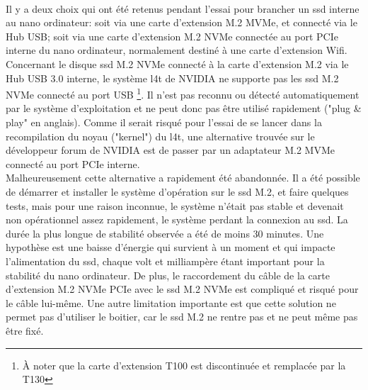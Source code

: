\vspace{\baselineskip}
\\
\noindent Il y a deux choix qui ont été retenus pendant l'essai pour brancher un \acrshort{ssd} interne au nano ordinateur: soit via une carte d'extension M.2 MVMe, et connecté via le Hub USB; soit via une carte d'extension M.2 NVMe connectée au port PCIe interne du nano ordinateur, normalement destiné à une carte d'extension Wifi.
\vspace{\baselineskip}
\\
\noindent Concernant le disque \acrshort{ssd} M.2 NVMe connecté à la carte d'extension M.2 via le Hub USB 3.0 interne, le système \acrshort{l4t} de NVIDIA ne supporte pas les \acrshort{ssd} M.2 NVMe connecté au port USB \footnote{À noter que la carte d'extension T100 est discontinuée et remplacée par la T130}. Il n'est pas reconnu ou détecté automatiquement par le système d'exploitation et ne peut donc pas être utilisé rapidement ("plug \& play" en anglais). Comme il serait risqué pour l'essai de se lancer dans la recompilation du noyau ("kernel") du \acrshort{l4t}, une alternative trouvée sur le développeur forum de NVIDIA est de passer par un adaptateur M.2 MVMe connecté au port PCIe interne.
\vspace{\baselineskip}
\\
\noindent Malheureusement cette alternative a rapidement été abandonnée. Il a été possible de démarrer et installer le système d'opération sur le \acrshort{ssd} M.2, et faire quelques tests, mais pour une raison inconnue, le système n'était pas stable et devenait non opérationnel assez rapidement, le système perdant la connexion au \acrshort{ssd}. La durée la plus longue de stabilité observée a été de moins 30 minutes. Une hypothèse est une baisse d'énergie qui survient à un moment et qui impacte l'alimentation du \acrshort{ssd}, chaque volt et milliampère étant important pour la stabilité du nano ordinateur. De plus, le raccordement du câble de la carte d'extension M.2 NVMe PCIe avec le \acrshort{ssd} M.2 NVMe est compliqué et risqué pour le câble lui-même. Une autre limitation importante est que cette solution ne permet pas d'utiliser le boitier, car le \acrshort{ssd} M.2 ne rentre pas et ne peut même pas être fixé. 

